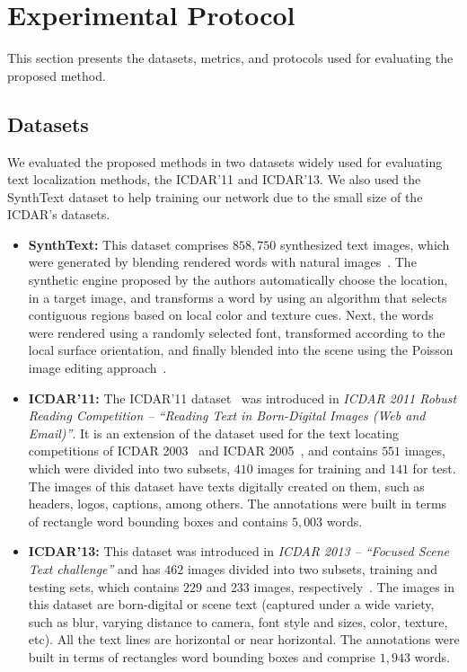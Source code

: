 \section{Experimental Protocol}
\label{sec:experiments-results}

This section presents the datasets,
metrics, 
and protocols used for evaluating the proposed method.

\subsection{Datasets}
We evaluated the proposed methods in two datasets widely used for evaluating text localization methods, the ICDAR'11 and ICDAR'13. We also used the SynthText dataset to help
training our network due to the small size of the ICDAR's datasets.

\begin{itemize}
    \item {\bf SynthText:} This dataset comprises $858,750$ synthesized text images, which were generated by blending rendered words with natural images~\cite{Gupta2016CVPR}. The synthetic engine proposed by the authors automatically choose the location, in a target image, and transforms a word by using an algorithm that selects contiguous regions based on local color and texture cues. Next, the words were rendered using a randomly selected font,
transformed according to the local surface orientation, and 
finally blended into the scene using the Poisson image editing approach~\cite{Perez2003ToG}.

\item{\bf ICDAR'11:} The ICDAR'11 dataset~\cite{Karatzas2011ICDAR} was introduced in \textit{ICDAR 2011 Robust Reading Competition -- ``Reading Text in Born-Digital Images (Web and Email)''}. 
It is an extension of the dataset used for the text locating competitions of ICDAR 2003~\cite{Lucas2003ICDAR} and ICDAR 2005~\cite{Lucas2005ICDAR}, and contains $551$ images, which were divided into two subsets, 
$410$ images for training and $141$ for test.
The images of this dataset have texts digitally created on them, such as headers, logos, captions, among others. The annotations were built in terms of rectangle word bounding boxes and contains $5,003$ words.

\item{\bf ICDAR'13:}
This dataset was introduced in \textit{ICDAR 2013 -- ``Focused Scene Text challenge''} and has $462$ images divided into two subsets, training and testing sets, which contains $229$ and $233$ images, respectively~\cite{Karatzas2013ICDAR}. The images in this dataset are born-digital or scene text (captured under a wide variety, such as blur, varying distance to camera, font style and sizes, color, texture, etc). All the text lines are horizontal or near horizontal. The annotations were built in terms of rectangles word bounding boxes and comprise $1,943$ words.

\end{itemize}

